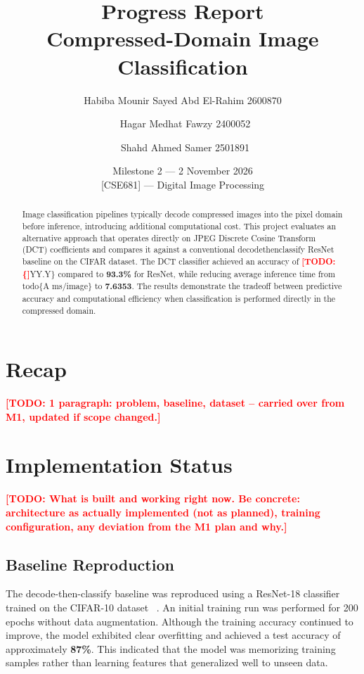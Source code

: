 \documentclass[11pt]{article}
\title{\LARGE Progress Report \\[4pt]
\large Compressed-Domain Image Classification}
\author{
  Habiba Mounir Sayed Abd El-Rahim 2600870\and
  \ Hagar Medhat Fawzy 2400052\and
  \ Shahd Ahmed Samer 2501891
}
\date{Milestone 2 --- 2 November 2026 \\{} [CSE681] --- Digital Image Processing}
\newcommand{\todo}[1]{\textcolor{red}{\textbf{[TODO: #1]}}}
\begin{document}
\maketitle

\begin{abstract}
Image classification pipelines typically decode compressed images into the pixel domain before inference, introducing additional computational cost.
This project evaluates an alternative approach that operates directly on JPEG Discrete Cosine Transform (DCT) coefficients and compares it against a conventional decode\-then\-classify ResNet baseline on the CIFAR dataset.
The DCT classifier achieved an accuracy of \todo\{YY.Y\} compared to \textbf{93.3\%} for ResNet, while reducing average inference time
from \\todo\{A ms/image\} to \textbf{7.6353}. The results demonstrate the trade\-off between predictive accuracy and computational efficiency when classification is performed directly in the compressed domain.
\end{abstract}

\section{Recap}
\label{sec:recap}
\todo{1 paragraph: problem, baseline, dataset -- carried over from M1, updated if scope
changed.}

\section{Implementation Status}
\label{sec:status}
\todo{What is built and working right now. Be concrete: architecture as actually
implemented (not as planned), training configuration, any deviation from the M1 plan
and why.}

\subsection{Baseline Reproduction}
The decode-then-classify baseline was reproduced using a ResNet-18 classifier ~\cite{he2016deep} trained on the CIFAR-10 dataset ~\cite{krizhevsky2009cifar}.
An initial training run was performed for 200 epochs without data augmentation.
Although the training accuracy continued to improve, the model exhibited clear overfitting and achieved a test accuracy of approximately \textbf{87\%}.
This indicated that the model was memorizing training samples rather than learning features that generalized well to unseen data.
\end{document}
